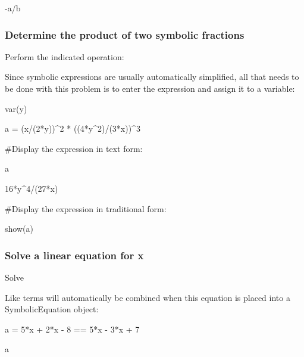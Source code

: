 \documentclass[12pt,twoside]{book}
\begin{document}
{\textbar}

{}-a/b


\bigskip

\subsubsection[Determine the product of two symbolic
fractions]{Determine the product of two symbolic fractions}
Perform the indicated operation: 


\bigskip

{\textquotedbl}{\textquotedbl}{\textquotedbl}

Since symbolic expressions are usually automatically simplified, all
that needs to be done with this problem is to enter the expression and
assign it to a variable:

{\textquotedbl}{\textquotedbl}{\textquotedbl}


\bigskip

var({\textquotesingle}y{\textquotesingle})

a = (x/(2*y))\^{}2 * ((4*y\^{}2)/(3*x))\^{}3


\bigskip

\#Display the expression in text form:

a

{\textbar}

16*y\^{}4/(27*x)


\bigskip


\bigskip

\#Display the expression in traditional form:

show(a)

{\textbar}

 

 


\bigskip

\subsubsection[Solve a linear equation for x]{Solve a
linear equation for x}
Solve 


\bigskip

{\textquotedbl}{\textquotedbl}{\textquotedbl}

Like terms will automatically be combined when this equation is placed
into a SymbolicEquation object:

{\textquotedbl}{\textquotedbl}{\textquotedbl}

a = 5*x + 2*x {}- 8 == 5*x {}- 3*x + 7

a
\end{document}
